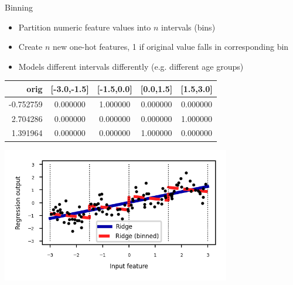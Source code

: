 \begin{frame}[allowframebreaks]{Binning}

\begin{itemize}
    \item Partition numeric feature values into $n$ intervals (bins)
    \item Create $n$ new one-hot features, 1 if original value falls in corresponding bin
    \item Models different intervals differently (e.g. different age groups)
\end{itemize}

\begin{center}
\begin{tabular}{rcccc}
\textbf{orig} & \textbf{[-3.0,-1.5]} & \textbf{[-1.5,0.0]} & \textbf{[0.0,1.5]} & \textbf{[1.5,3.0]} \\
\hline
-0.752759 & 0.000000 & 1.000000 & 0.000000 & 0.000000 \\
 2.704286 & 0.000000 & 0.000000 & 0.000000 & 1.000000 \\
 1.391964 & 0.000000 & 0.000000 & 1.000000 & 0.000000 \\
\end{tabular}
\end{center}

\vspace{1em}

\begin{center}
    \includegraphics[width=0.75\textwidth]{images/pre-processing/binning.png}
\end{center}

\end{frame}


